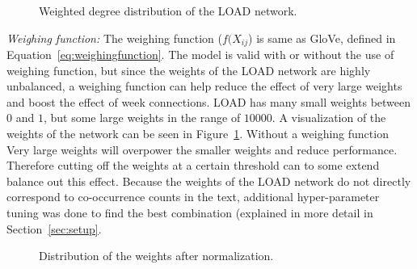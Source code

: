 \begin{figure}
\centering 
\resizebox{0.6\textwidth}{0.6\textwidth}{      

}
\caption{Weighted degree distribution of the LOAD network. }
\label{fig:degree1}
\end{figure}
\noindent
\emph{Weighing function:} The weighing function ($f(X_{ij}$) is same as GloVe, defined in Equation~\ref{eq:weighingfunction}. The model is valid with or without the use of weighing function, but since the weights of the LOAD network are highly unbalanced, a weighing function can help reduce the effect of very large weights and boost the effect of week connections. LOAD has many small weights between $0$ and $1$, but some large weights in the range of $10000$. A visualization of the weights of the network can be seen in Figure~\ref{fig:degree1}. Without a weighing function Very large weights will overpower the smaller weights and reduce performance. Therefore cutting off the weights at a certain threshold can to some extend balance out this effect. Because the weights of the LOAD network do not directly correspond to co-occurrence counts in the text, additional hyper-parameter tuning was done to find the best combination (explained in more detail in Section~\ref{sec:setup}. \\
\begin{figure}
\centering
\resizebox{0.6\textwidth}{0.6\textwidth}{      

}
\caption{Distribution of the weights after normalization.}
\label{fig:norm}
\end{figure}

